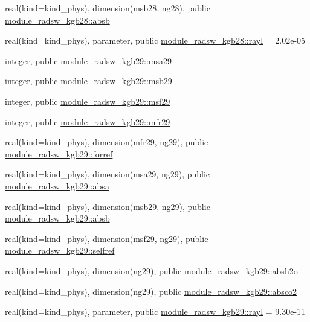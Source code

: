 \begin{DoxyCompactItemize}
\item 
real(kind=kind\+\_\+phys), dimension(msb28, ng28), public \hyperlink{namespacemodule__radsw__kgb28_ac3834ddd9d9e2106dc739094c800d09b}{module\+\_\+radsw\+\_\+kgb28\+::absb}
\item 
real(kind=kind\+\_\+phys), parameter, public \hyperlink{namespacemodule__radsw__kgb28_af3641febf88e97741b2cd86a56eda843}{module\+\_\+radsw\+\_\+kgb28\+::rayl} = 2.\+02e-\/05
\item 
integer, public \hyperlink{namespacemodule__radsw__kgb29_adbee6e5d3b3efc437ff8815e42962b92}{module\+\_\+radsw\+\_\+kgb29\+::msa29}
\item 
integer, public \hyperlink{namespacemodule__radsw__kgb29_add8e18a273d5fa133f22fb47c4d722da}{module\+\_\+radsw\+\_\+kgb29\+::msb29}
\item 
integer, public \hyperlink{namespacemodule__radsw__kgb29_ace849342fcb0d18d825318a2ee26ce0e}{module\+\_\+radsw\+\_\+kgb29\+::msf29}
\item 
integer, public \hyperlink{namespacemodule__radsw__kgb29_a866ce18e53b84d75d51dd8c6a999ee7b}{module\+\_\+radsw\+\_\+kgb29\+::mfr29}
\item 
real(kind=kind\+\_\+phys), dimension(mfr29, ng29), public \hyperlink{namespacemodule__radsw__kgb29_a6e4d495b4588d3c794047e71497661a0}{module\+\_\+radsw\+\_\+kgb29\+::forref}
\item 
real(kind=kind\+\_\+phys), dimension(msa29, ng29), public \hyperlink{namespacemodule__radsw__kgb29_a1132fd19edc0312f6bcc905619f3bdfd}{module\+\_\+radsw\+\_\+kgb29\+::absa}
\item 
real(kind=kind\+\_\+phys), dimension(msb29, ng29), public \hyperlink{namespacemodule__radsw__kgb29_ac9fb794bc4e4a02964b5e5d1431c31c3}{module\+\_\+radsw\+\_\+kgb29\+::absb}
\item 
real(kind=kind\+\_\+phys), dimension(msf29, ng29), public \hyperlink{namespacemodule__radsw__kgb29_a468e2dd6001734d10784c8fb7b5df4e3}{module\+\_\+radsw\+\_\+kgb29\+::selfref}
\item 
real(kind=kind\+\_\+phys), dimension(ng29), public \hyperlink{namespacemodule__radsw__kgb29_acab70725ca7faf002f04306fe1798e02}{module\+\_\+radsw\+\_\+kgb29\+::absh2o}
\item 
real(kind=kind\+\_\+phys), dimension(ng29), public \hyperlink{namespacemodule__radsw__kgb29_aa9a57e32dfbb8979478aa8c931ff0e2d}{module\+\_\+radsw\+\_\+kgb29\+::absco2}
\item 
real(kind=kind\+\_\+phys), parameter, public \hyperlink{namespacemodule__radsw__kgb29_abc0a41a10d73674e124115fe0511cc23}{module\+\_\+radsw\+\_\+kgb29\+::rayl} = 9.\+30e-\/11
\end{DoxyCompactItemize}
